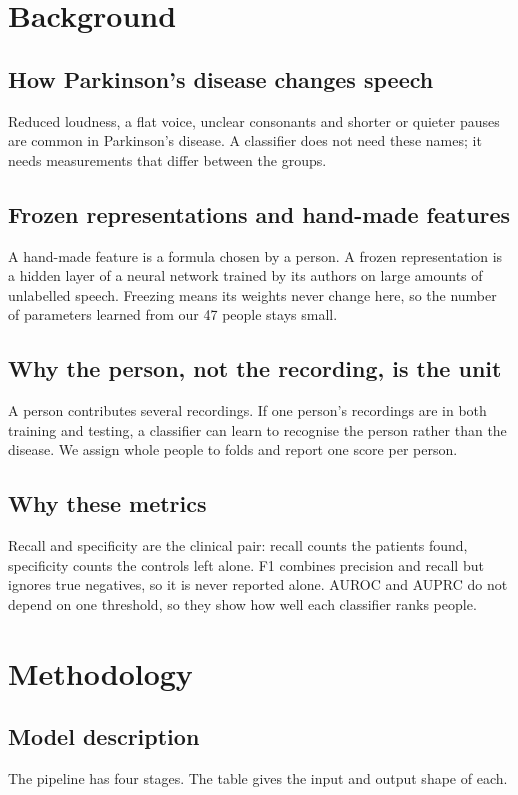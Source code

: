 \documentclass[11pt,a4paper]{article}
\begin{document}
\section{Background}\label{sec:background}
\subsection{How Parkinson's disease changes speech}
Reduced loudness, a flat voice, unclear consonants and shorter or quieter pauses are common in Parkinson's disease. A classifier does not need these names; it needs measurements that differ between the groups.

\subsection{Frozen representations and hand-made features}
A hand-made feature is a formula chosen by a person. A frozen representation is a hidden layer of a neural network trained by its authors on large amounts of unlabelled speech. Freezing means its weights never change here, so the number of parameters learned from our 47 people stays small.

\subsection{Why the person, not the recording, is the unit}
A person contributes several recordings. If one person's recordings are in both training and testing, a classifier can learn to recognise the person rather than the disease. We assign whole people to folds and report one score per person.

\subsection{Why these metrics}
Recall and specificity are the clinical pair: recall counts the patients found, specificity counts the controls left alone. F1 combines precision and recall but ignores true negatives, so it is never reported alone. AUROC and AUPRC do not depend on one threshold, so they show how well each classifier ranks people.

\section{Methodology}\label{sec:method}
\subsection{Model description}\label{sec:model}
The pipeline has four stages. The table gives the input and output shape of each.
\end{document}
